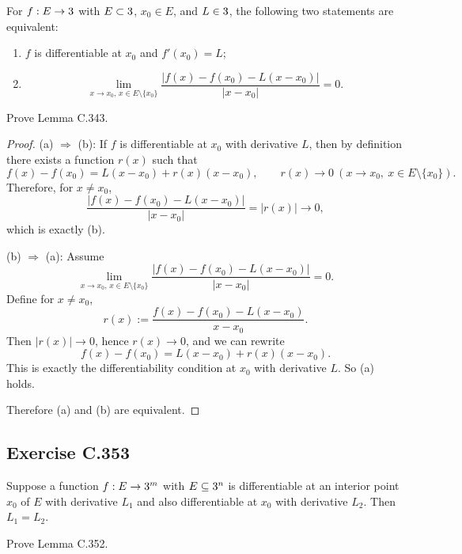 \documentclass{article}
\begin{document}
\begin{lemma}[Lemma C.343]
  For $f : E \to 3$ with $E \subset 3$, $x_0 \in E$, and $L \in 3$,
  the following two statements are equivalent:
  \begin{enumerate}
    \item $f$ is differentiable at $x_0$ and $f'(x_0)=L$;
    \item
      \[
        \lim_{x\to x_0,\,x\in E\setminus\{x_0\}}
        \frac{|f(x)-f(x_0)-L(x-x_0)|}{|x-x_0|}=0.
      \]
  \end{enumerate}
\end{lemma}

Prove Lemma C.343.

\begin{proof}
  (a) $\Rightarrow$ (b): If $f$ is differentiable at $x_0$ with derivative
  $L$, then by definition there exists a function $r(x)$ such that
  \[
    f(x)-f(x_0)=L(x-x_0)+r(x)(x-x_0),
    \qquad r(x)\to 0 \ (x\to x_0,\ x\in E\setminus\{x_0\}).
  \]
  Therefore, for $x\neq x_0$,
  \[
    \frac{|f(x)-f(x_0)-L(x-x_0)|}{|x-x_0|}=|r(x)|\to 0,
  \]
  which is exactly (b).

  (b) $\Rightarrow$ (a): Assume
  \[
    \lim_{x\to x_0,\,x\in E\setminus\{x_0\}}
    \frac{|f(x)-f(x_0)-L(x-x_0)|}{|x-x_0|}=0.
  \]
  Define for $x\neq x_0$,
  \[
    r(x):=\frac{f(x)-f(x_0)-L(x-x_0)}{x-x_0}.
  \]
  Then $|r(x)|\to 0$, hence $r(x)\to 0$, and we can rewrite
  \[
    f(x)-f(x_0)=L(x-x_0)+r(x)(x-x_0).
  \]
  This is exactly the differentiability condition at $x_0$ with
  derivative $L$. So (a) holds.

  Therefore (a) and (b) are equivalent.
\end{proof}

\subsection{Exercise C.353}

\begin{lemma}[Lemma C.352]
  Suppose a function $f : E \to 3^m$ with $E \subseteq 3^n$
  is differentiable at an interior point $x_0$ of $E$ with derivative
  $L_1$ and also differentiable at $x_0$ with derivative $L_2$.
  Then $L_1=L_2$.
\end{lemma}

Prove Lemma C.352.
\end{document}
